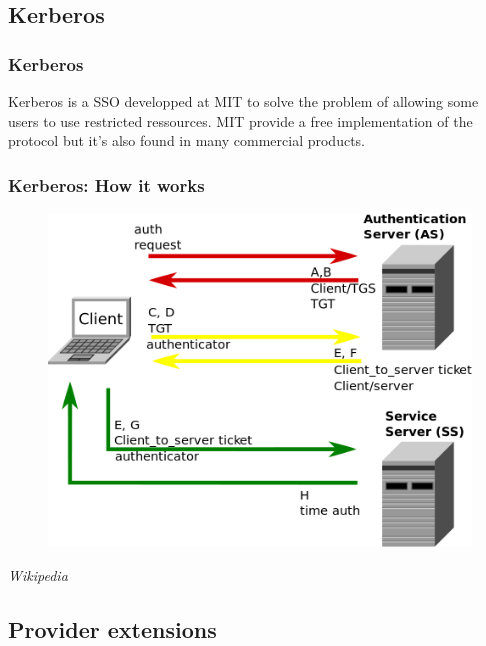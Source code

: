 
\subsection{Kerberos}


\begin{frame}
\frametitle{Kerberos}

Kerberos is a SSO developped at MIT to solve the problem of allowing
some users to use restricted ressources. MIT provide a free
implementation of the protocol but it's also found in many commercial
products.

\end{frame}


\begin{frame}
\frametitle{Kerberos: How it works}

\begin{figure}
  \includegraphics[scale = 0.35]{img/kerberos.png}
\end{figure}
\textit{Wikipedia}
\end{frame}

\subsection{Provider extensions}

